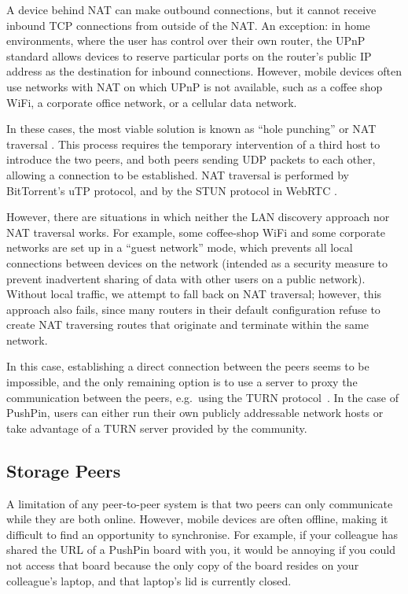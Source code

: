 \documentclass[sigplan,10pt]{acmart}
\begin{document}
A device behind NAT can make outbound connections, but it cannot receive inbound TCP connections from outside of the NAT.
An exception: in home environments, where the user has control over their own router, the UPnP standard allows devices to reserve particular ports on the router's public IP address as the destination for inbound connections.
However, mobile devices often use networks with NAT on which UPnP is not available, such as a coffee shop WiFi, a corporate office network, or a cellular data network.

In these cases, the most viable solution is known as ``hole punching'' or NAT traversal \cite{RFC5389}.
This process requires the temporary intervention of a third host to introduce the two peers, and both peers sending UDP packets to each other, allowing a connection to be established.
NAT traversal is performed by BitTorrent's uTP protocol, and by the STUN protocol in WebRTC \cite{RFC5389}.

However, there are situations in which neither the LAN discovery approach nor NAT traversal works.
For example, some coffee-shop WiFi and some corporate networks are set up in a ``guest network'' mode, which prevents all local connections between devices on the network (intended as a security measure to prevent inadvertent sharing of data with other users on a public network).
Without local traffic, we attempt to fall back on NAT traversal; however, this approach also fails, since many routers in their default configuration refuse to create NAT traversing routes that originate and terminate within the same network.

In this case, establishing a direct connection between the peers seems to be impossible, and the only remaining option is to use a server to proxy the communication between the peers, e.g.\ using the TURN protocol~\cite{RFC5766}.
In the case of PushPin, users can either run their own publicly addressable network hosts or take advantage of a TURN server provided by the community.

\subsection{Storage Peers}

A limitation of any peer-to-peer system is that two peers can only communicate while they are both online.
However, mobile devices are often offline, making it difficult to find an opportunity to synchronise.
For example, if your colleague has shared the URL of a PushPin board with you, it would be annoying if you could not access that board because the only copy of the board resides on your colleague's laptop, and that laptop's lid is currently closed.
\end{document}
